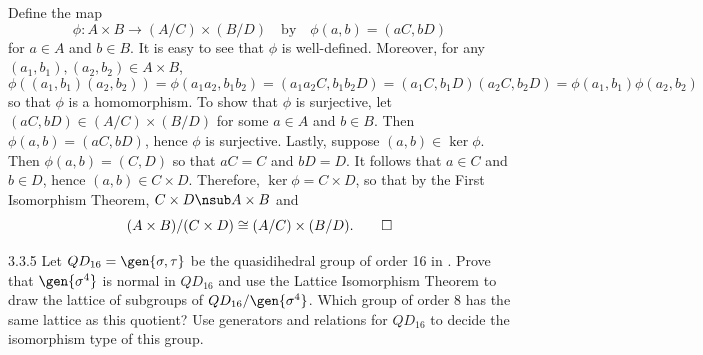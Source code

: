 \begin{sol}
    Define the map
    \[
    	\phi : A \times B \to (A/C) \times (B/D) \quad \text{by} \quad \phi(a, b) = (aC, bD)
    \]
    for $a \in A$ and $b \in B$.
	It is easy to see that $\phi$ is well-defined.
	Moreover, for any $(a_1, b_1), (a_2, b_2) \in A \times B$,
    \[
    	\phi((a_1, b_1)(a_2, b_2)) = \phi(a_1a_2, b_1b_2) = (a_1a_2C, b_1b_2D) = (a_1C, b_1D)(a_2C, b_2D) = \phi(a_1, b_1) \phi(a_2, b_2)
    \]
    so that $\phi$ is a homomorphism.
	To show that $\phi$ is surjective, let $(aC, bD) \in (A/C) \times (B/D)$ for some $a \in A$ and $b \in B$.
	Then $\phi(a, b) = (aC, bD)$, hence $\phi$ is surjective.
	Lastly, suppose $(a, b) \in \ker\phi$.
	Then $\phi(a, b) = (C, D)$ so that $aC = C$ and $bD = D$.
	It follows that $a \in C$ and $b \in D$, hence $(a, b) \in C \times D$.
	Therefore, $\ker\phi = C \times D$, so that by the First Isomorphism Theorem, $C \times D \nsub A \times B$ and
    \[
    	(A \times B)/(C \times D) \cong (A/C) \times (B/D). \qedhere
    \]
\end{sol}

\begin{exercise}{3.3.5}
    Let $QD_{16} = \gen{\sigma, \tau}$ be the quasidihedral group of order 16 in .
	Prove that $\gen{\sigma^4}$ is normal in $QD_{16}$ and use the Lattice Isomorphism Theorem to draw the lattice of subgroups of $QD_{16}/\gen{\sigma^4}$.
	Which group of order 8 has the same lattice as this quotient?
	Use generators and relations for $QD_{16}$ to decide the isomorphism type of this group.
\end{exercise}

